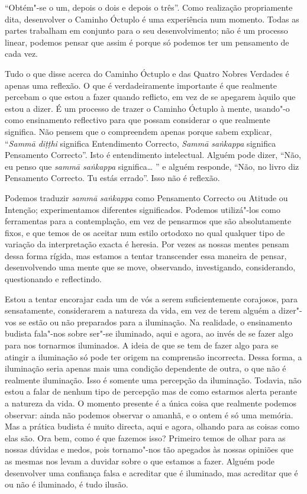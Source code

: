 “Obtém"-se o um, depois o dois e depois o três”. Como realização propriamente
dita, desenvolver o Caminho Óctuplo é uma experiência num momento. Todas as
partes trabalham em conjunto para o seu desenvolvimento; não é um processo
linear, podemos pensar que assim é porque só podemos ter um pensamento de cada
vez.

Tudo o que disse acerca do Caminho Óctuplo e das Quatro Nobres Verdades é apenas
uma reflexão. O que é verdadeiramente importante é que realmente percebam o que
estou a fazer quando reflicto, em vez de se apegarem àquilo que estou a dizer. É
um processo de trazer o Caminho Óctuplo à mente, usando"-o como ensinamento
reflectivo para que possam considerar o que realmente significa. Não pensem que o
compreendem apenas porque sabem explicar, “\emph{Sammā diṭṭhi} significa
Entendimento Correcto, \emph{Sammā saṅkappa} significa Pensamento Correcto”.
Isto é entendimento intelectual. Alguém pode dizer, “Não, eu penso que
\emph{sammā saṅkappa} significa\ldots{} ” e alguém responde, “Não, no livro diz
Pensamento Correcto. Tu estás errado”. Isso não é reflexão.

Podemos traduzir \emph{sammā saṅkappa} como Pensamento Correcto ou Atitude ou
Intenção; experimentamos diferentes \mbox{significados}. Podemos utilizá"-los como
ferramentas para a contemplação, em vez de pensarmos que são absolutamente
fixos, e que temos de os aceitar num estilo ortodoxo no qual qualquer tipo de variação
da interpretação exacta é heresia. Por vezes as nossas mentes pensam dessa forma
rígida, mas estamos a tentar transcender essa maneira de pensar, desenvolvendo
uma mente que se move, observando, investigando, considerando, questionando e
reflectindo.

Estou a tentar encorajar cada um de vós a serem suficientemente corajosos, para
sensatamente, considerarem a natureza da vida, em vez de terem alguém a
dizer"-vos se estão ou não preparados para a iluminação. Na realidade, o
ensinamento budista fala"-nos sobre ser"-se iluminado, aqui e agora, ao invés de
se fazer algo para nos tornarmos iluminados. A ideia de que se tem de fazer algo
para se atingir a iluminação só pode ter origem na comprensão incorrecta.
Dessa forma, a iluminação seria apenas mais uma condição dependente de outra, o que
não é realmente iluminação. Isso é somente uma percepção da iluminação. Todavia, não
estou a falar de nenhum tipo de percepção mas de como estarmos alerta perante a
natureza da vida. O momento presente é a única coisa que realmente podemos
observar: ainda não podemos observar o amanhã, e o ontem é só uma memória. Mas a
prática budista é muito directa, aqui e agora, olhando para as coisas como elas
são. Ora bem, como é que fazemos isso? Primeiro temos de olhar para as nossas
dúvidas e medos, pois tornamo"-nos tão apegados às nossas opiniões que as mesmas
nos levam a duvidar sobre o que estamos a fazer. Alguém pode desenvolver uma
confiança falsa e acreditar que é iluminado, mas acreditar que é ou não é
iluminado, é tudo ilusão.

